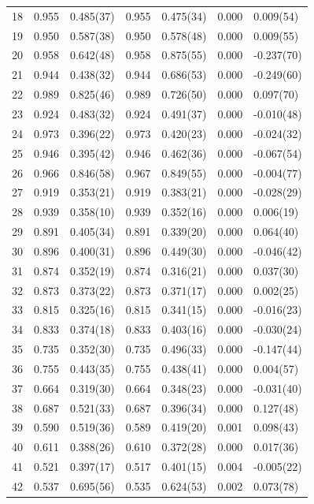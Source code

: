 \documentclass[aps, prc, tightenlines,superscriptaddress, letterpaper, amsmath, amssymb, preprintnumbers, floatfix, longbibliography, nofootinbib]{revtex4-2}
\begin{document}
\begin{table}[!htb]
{\begin{tabularx}{\textwidth}{| c || Y | Y | Y | Y | Y | Y |}
18	&	0.955	&	0.485(37)	&	0.955	&	0.475(34)	&	0.000	&	0.009(54)	\\
19	&	0.950	&	0.587(38)	&	0.950	&	0.578(48)	&	0.000	&	0.009(55)	\\
20	&	0.958	&	0.642(48)	&	0.958	&	0.875(55)	&	0.000	&	-0.237(70)	\\
21	&	0.944	&	0.438(32)	&	0.944	&	0.686(53)	&	0.000	&	-0.249(60)	\\
22	&	0.989	&	0.825(46)	&	0.989	&	0.726(50)	&	0.000	&	0.097(70)	\\
23	&	0.924	&	0.483(32)	&	0.924	&	0.491(37)	&	0.000	&	-0.010(48)	\\
24	&	0.973	&	0.396(22)	&	0.973	&	0.420(23)	&	0.000	&	-0.024(32)	\\
25	&	0.946	&	0.395(42)	&	0.946	&	0.462(36)	&	0.000	&	-0.067(54)	\\
26	&	0.966	&	0.846(58)	&	0.967	&	0.849(55)	&	0.000	&	-0.004(77)	\\
27	&	0.919	&	0.353(21)	&	0.919	&	0.383(21)	&	0.000	&	-0.028(29)	\\
28	&	0.939	&	0.358(10)	&	0.939	&	0.352(16)	&	0.000	&	0.006(19)	\\
29	&	0.891	&	0.405(34)	&	0.891	&	0.339(20)	&	0.000	&	0.064(40)	\\
30	&	0.896	&	0.400(31)	&	0.896	&	0.449(30)	&	0.000	&	-0.046(42)	\\
31	&	0.874	&	0.352(19)	&	0.874	&	0.316(21)	&	0.000	&	0.037(30)	\\
32	&	0.873	&	0.373(22)	&	0.873	&	0.371(17)	&	0.000	&	0.002(25)	\\
33	&	0.815	&	0.325(16)	&	0.815	&	0.341(15)	&	0.000	&	-0.016(23)	\\
34	&	0.833	&	0.374(18)	&	0.833	&	0.403(16)	&	0.000	&	-0.030(24)	\\
35	&	0.735	&	0.352(30)	&	0.735	&	0.496(33)	&	0.000	&	-0.147(44)	\\
36	&	0.755	&	0.443(35)	&	0.755	&	0.438(41)	&	0.000	&	0.004(57)	\\
37	&	0.664	&	0.319(30)	&	0.664	&	0.348(23)	&	0.000	&	-0.031(40)	\\
38	&	0.687	&	0.521(33)	&	0.687	&	0.396(34)	&	0.000	&	0.127(48)	\\
39	&	0.590	&	0.519(36)	&	0.589	&	0.419(20)	&	0.001	&	0.098(43)	\\
40	&	0.611	&	0.388(26)	&	0.610	&	0.372(28)	&	0.000	&	0.017(36)	\\
41	&	0.521	&	0.397(17)	&	0.517	&	0.401(15)	&	0.004	&	-0.005(22)	\\
42	&	0.537	&	0.695(56)	&	0.535	&	0.624(53)	&	0.002	&	0.073(78)	\\

\end{tabularx}}
\end{table}
\end{document}
